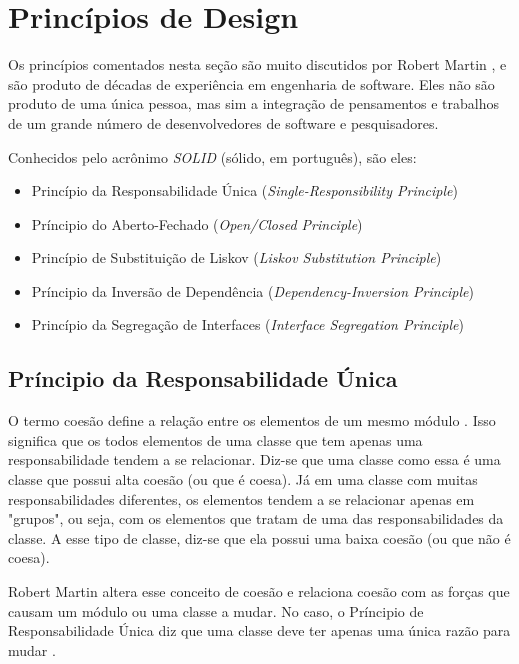 \section{Princípios de Design}
\label{sec:design-oo-principios}

Os princípios comentados nesta seção são muito discutidos por Robert Martin \cite{bob-martin}, e são produto de 
décadas de experiência em engenharia de software.
Eles não são produto de uma única pessoa, mas sim a integração de pensamentos e trabalhos de um grande número de
desenvolvedores de software e pesquisadores.

Conhecidos pelo acrônimo \textit{SOLID} (sólido, em português), são eles:

\begin{itemize}
	\item Princípio da Responsabilidade Única (\textit{Single-Responsibility Principle})
	\item Príncipio do Aberto-Fechado (\textit{Open/Closed Principle})
	\item Princípio de Substituição de Liskov (\textit{Liskov Substitution Principle})
	\item Príncipio da Inversão de Dependência (\textit{Dependency-Inversion Principle})
	\item Princípio da Segregação de Interfaces (\textit{Interface Segregation Principle})
\end{itemize}

\subsection{Príncipio da Responsabilidade Única}
\label{subsec:principio-srp}

O termo coesão define a relação entre os elementos de um mesmo módulo \cite{demarco} \cite{pagejones}. Isso significa que
os todos elementos de uma classe que tem apenas uma responsabilidade tendem a se relacionar. Diz-se que uma classe
como essa é uma classe que possui alta coesão (ou que é coesa). Já em uma classe
com muitas responsabilidades diferentes, os elementos tendem a se relacionar apenas em "grupos", ou seja, com os elementos
que tratam de uma das responsabilidades da classe. A esse tipo de classe, diz-se que ela possui uma baixa coesão (ou que não é
coesa).

Robert Martin altera esse conceito de coesão e relaciona coesão com as forças que causam um módulo ou uma classe a mudar. No caso,
o Príncipio de Responsabilidade Única diz que uma classe deve ter apenas uma única razão para mudar \cite{bob-martin}.

